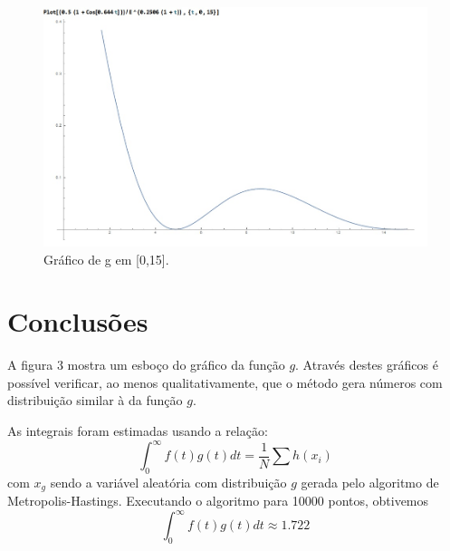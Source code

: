 \documentclass[a4paper,10pt]{article}
\begin{document}
\begin{figure}
\centering
\includegraphics[width=1.2\textwidth]{g.jpg}
\caption{\label{fig:garf2}Gráfico de g em [0,15]. }
\end{figure}

\section{Conclusões}
A figura 3 mostra um esboço do gráfico da função $g$. Através destes gráficos é possível verificar, ao menos qualitativamente, que o método gera números com distribuição similar à da função $g$.
 
 As integrais foram estimadas usando a relação:
\[ \int_0^\infty f(t)g(t)dt=\dfrac{1}{N} \sum{h(x_i)} \]
com  $x_g$ sendo a variável aleatória com distribuição $g$ gerada pelo algoritmo de Metropolis-Hastings.
Executando o algoritmo para 10000 pontos, obtivemos
\[ \int_0^\infty f(t)g(t)dt \approx 1.722\]
\end{document}
